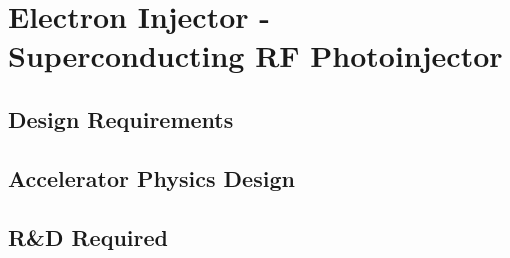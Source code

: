\section{Electron Injector - Superconducting RF Photoinjector}

\subsection{Design Requirements}

\subsection{Accelerator Physics Design}

\subsection{R\&D Required}

\blankline
\blankline
